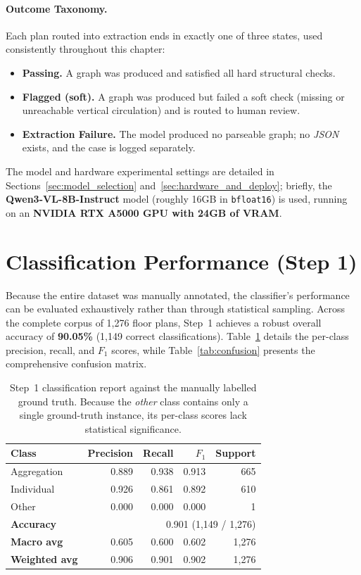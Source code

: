 \documentclass[12pt,a4paper,openright]{report}
\newcommand{\code}[1]{\texttt{#1}}
\begin{document}
\paragraph{Outcome Taxonomy.} Each plan routed into extraction ends in exactly one of three states, used consistently throughout this chapter:
\begin{itemize}
    \item \textbf{Passing.} A graph was produced and satisfied all hard structural checks.
    \item \textbf{Flagged (soft).} A graph was produced but failed a soft check (missing or unreachable vertical circulation) and is routed to human review.
    \item \textbf{Extraction Failure.} The model produced no parseable graph; no \textit{JSON} exists, and the case is logged separately.
\end{itemize}

\noindent The model and hardware experimental settings are detailed in
Sections~\ref{sec:model_selection} and~\ref{sec:hardware_and_deploy}; briefly, the \textbf{Qwen3-VL-8B-Instruct} model (roughly 16GB in \code{bfloat16}) is used, running on an \textbf{NVIDIA RTX A5000 GPU with 24GB of VRAM}.


\section{Classification Performance (Step 1)}
\label{sec:exp-classification}

Because the entire dataset was manually annotated, the classifier's performance can be evaluated exhaustively rather than through statistical sampling. Across the complete corpus of 1,276 floor plans, Step~1 achieves a robust overall accuracy of \textbf{90.05\%} (1,149 correct classifications). Table~\ref{tab:class-report} details the per-class precision, recall, and $F_1$ scores, while Table~\ref{tab:confusion} presents the comprehensive confusion matrix.

\begin{table}[ht]
\centering
\begin{tabular}{@{}lrrrr@{}}
\toprule
\textbf{Class} & \textbf{Precision} & \textbf{Recall} & \textbf{$F_1$} & \textbf{Support} \\
\midrule
Aggregation & 0.889 & 0.938 & 0.913 & 665 \\
Individual  & 0.926 & 0.861 & 0.892 & 610 \\
Other       & 0.000 & 0.000 & 0.000 &   1 \\
\midrule
\textbf{Accuracy}     & \multicolumn{4}{r}{0.901 \quad (1{,}149 / 1{,}276)} \\
\textbf{Macro avg}    & 0.605 & 0.600 & 0.602 & 1{,}276 \\
\textbf{Weighted avg} & 0.906 & 0.901 & 0.902 & 1{,}276 \\
\bottomrule
\end{tabular}
\caption{Step~1 classification report against the manually labelled ground truth. Because the \textit{other} class contains only a single ground-truth instance, its per-class scores lack statistical significance.}
\label{tab:class-report}
\end{table}
\end{document}
